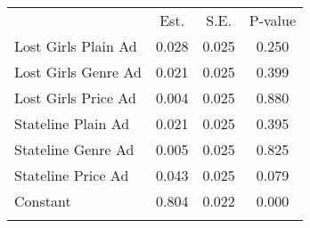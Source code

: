 \begin{center}
\begin{tabular}{lccc}
\hline \noalign{\smallskip} & Est. & S.E. & P-value\\
\noalign{\smallskip}\hline \noalign{\smallskip}\hspace{5pt} Lost Girls Plain Ad & 0.028 & 0.025 & 0.250\\
\hspace{5pt} Lost Girls Genre Ad & 0.021 & 0.025 & 0.399\\
\hspace{5pt} Lost Girls Price Ad & 0.004 & 0.025 & 0.880\\
\hspace{5pt} Stateline Plain Ad & 0.021 & 0.025 & 0.395\\
\hspace{5pt} Stateline Genre Ad & 0.005 & 0.025 & 0.825\\
\hspace{5pt} Stateline Price Ad & 0.043 & 0.025 & 0.079\\
\hspace{5pt} Constant & 0.804 & 0.022 & 0.000\\
\noalign{\smallskip}\hline\end{tabular}\\
\end{center}
